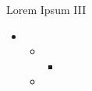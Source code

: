 \begin{titledbox}{Lorem Ipsum III}
    \lipsum[4]
    \begin{itemize}
        \item \lipsum[4]
            \begin{itemize}
                \item \lipsum[4]
                    \begin{itemize}
                        \item \lipsum[4]
                    \end{itemize}
                \item \lipsum[4]
            \end{itemize}
    \end{itemize}
\end{titledbox}